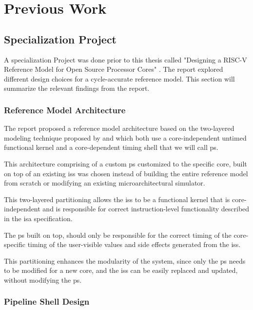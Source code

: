 \chapter{Previous Work}

\section{Specialization Project}
\label{sec:specialization}

A specialization Project was done prior to this thesis called "Designing a RISC-V Reference Model for Open Source Processor Cores" \cite{torjenygaardeikenesDesigningRISCVReference2023}. The report explored different design choices for a cycle-accurate reference model. This section will summarize the relevant findings from the report.




\subsection{Reference Model Architecture}
\label{sec:pw_architecture}

The report proposed a reference model architecture based on the two-layered modeling technique proposed by \textcite{chiangEfficientTwolayeredCycleaccurate2009} and \textcite{leeFaCSimFastCycleAccurate2008} which both use a core-independent untimed functional kernel and a core-dependent timing shell that we will call \gls{ps}.

This architecture comprising of a custom \gls{ps} customized to the specific core, built on top of an existing \acrshort{iss} was chosen instead of building the entire reference model from scratch or modifying an existing microarchitectural simulator. 

This two-layered partitioning allows the \acrshort{iss} to be a functional kernel that is core-independent and is responsible for correct instruction-level functionality described in the \acrshort{isa} specification. 

The \gls{ps} built on top, should only be responsible for the correct timing of the core-specific timing of the user-visible values and side effects generated from the \acrshort{iss}. 

This partitioning enhances the modularity of the system, since only the \gls{ps} needs to be modified for a new core, and the \acrshort{iss} can be easily replaced and updated, without modifying the \gls{ps}. 


\subsection{Pipeline Shell Design}
\label{sec:pw_pipelineShellDesign}

